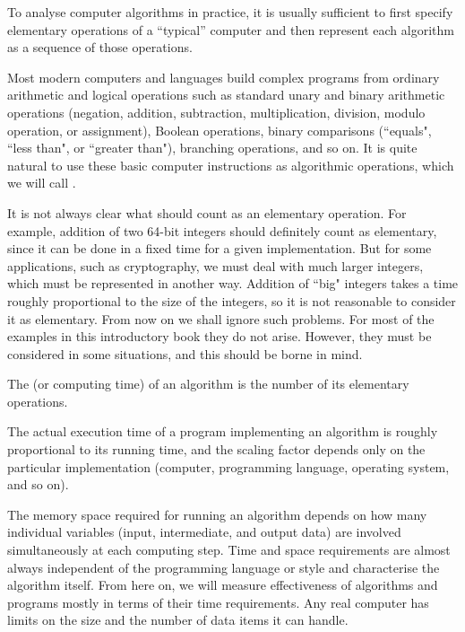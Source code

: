 To analyse computer algorithms in practice, it is usually sufficient to
first specify elementary operations of a ``typical'' computer and then
represent each algorithm as a sequence of those operations.

Most modern computers and languages build complex programs from
ordinary arithmetic and logical operations such as standard unary and
binary arithmetic operations (negation, addition, subtraction,
multiplication, division, modulo operation, or assignment), Boolean
operations, binary comparisons (``equals", ``less than", or
``greater than"), branching operations, and so on. It is quite natural
to use these basic computer instructions as algorithmic operations,
which we will call .

It is not always clear what should count as an elementary operation. For
example, addition of two 64-bit integers should definitely count
as elementary, since it can be done in a fixed time for a given
implementation. But for some applications, such as cryptography, we must
deal with much larger integers, which must be represented in another
way. Addition of ``big" integers takes a time roughly proportional to
the size of the integers, so it is not reasonable to consider it as
elementary. From now on we shall ignore such problems. For most of the
examples in this introductory book they do not arise. However, they must
be considered in some situations, and this should be borne in mind.

\begin{Definition} [informal]
The  (or computing time) of an algorithm
is the number of its elementary operations.
\end{Definition}

The actual execution time of a program implementing an algorithm is
roughly proportional to its running time, and the scaling factor depends
only on the particular implementation (computer, programming language,
operating system, and so on).

The memory space required for running an algorithm depends on how many individual
variables (input, intermediate, and output data) are involved
simultaneously at each computing step. Time and space requirements
are almost always independent of the programming language or style and
characterise the algorithm itself. From here on, we will measure
effectiveness of algorithms and programs mostly in terms of their time
requirements. Any real computer has limits on the size and the number of
data items it can handle.

